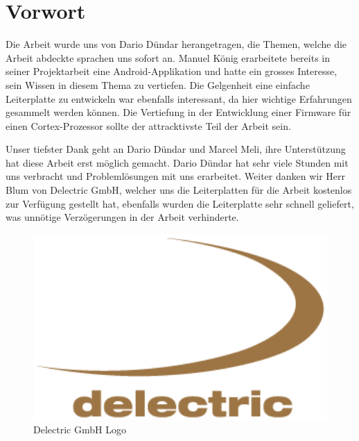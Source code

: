 \chapter{Vorwort}

Die Arbeit wurde uns von Dario Dündar herangetragen, die Themen, welche die Arbeit abdeckte sprachen uns sofort an. Manuel König erarbeitete bereits in seiner Projektarbeit eine Android-Applikation und hatte ein grosses Interesse, sein Wissen in diesem Thema zu vertiefen. Die Gelgenheit eine einfache Leiterplatte zu entwickeln war ebenfalls interessant, da hier wichtige Erfahrungen gesammelt werden können. Die Vertiefung in der Entwicklung einer Firmware für einen Cortex-Prozessor sollte der attracktivste Teil der Arbeit sein. 

Unser tiefster Dank geht an Dario Dündar und Marcel Meli, ihre Unterstützung hat diese Arbeit erst möglich gemacht. Dario Dündar hat sehr viele Stunden mit uns verbracht und Problemlösungen mit uns erarbeitet. Weiter danken wir Herr Blum von Delectric GmbH, welcher uns die Leiterplatten für die Arbeit kostenlos zur Verfügung gestellt hat, ebenfalls wurden die Leiterplatte sehr schnell geliefert, was unnötige Verzögerungen in der Arbeit verhinderte.

\begin{figure}[ht]
   \includegraphics[width=1\textwidth]{imag_vorwort/delectric_logo_gross.gif}
   \caption{Delectric GmbH Logo}
   \label{delectric_logo} 
\end{figure}





